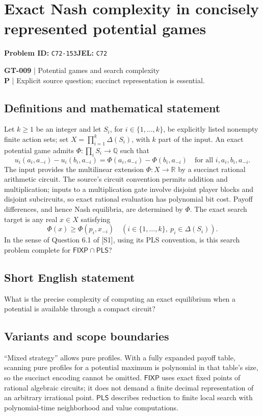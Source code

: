 \documentclass[11pt,a4paper]{article}
\begin{document}
\section*{Exact Nash complexity in concisely represented potential games}
\textbf{Problem ID:} \texttt{C72-153}\quad \textbf{JEL:} \texttt{C72}\par
\label{problem:OP-0139}
\label{game:GT-009}
{\sffamily\small\color{muted}
\textbf{GT-009} | Potential games and search complexity\\
\textbf{P} | Explicit source question; succinct representation is essential.
\par}
\subsection*{Definitions and mathematical statement}
Let $k\geq 1$ be an integer and let $S_i$, for $i\in\{1,\ldots,k\}$, be explicitly listed nonempty finite action sets; set $X=\prod_{i=1}^k\Delta(S_i)$, with $k$ part of the input. An exact potential game admits $\Phi:\prod_iS_i\to\mathbb Q$ such that
\[
 u_i(a_i,a_{-i})-u_i(b_i,a_{-i})
 =\Phi(a_i,a_{-i})-\Phi(b_i,a_{-i})
 \quad\text{for all }i,a_i,b_i,a_{-i}.
\]
The input provides the multilinear extension $\Phi:X\to\mathbb R$ by a succinct rational arithmetic circuit. The source's circuit convention permits addition and multiplication; inputs to a multiplication gate involve disjoint player blocks and disjoint subcircuits, so exact rational evaluation has polynomial bit cost. Payoff differences, and hence Nash equilibria, are determined by $\Phi$.
The exact search target is any real $x\in X$ satisfying
\[
 \Phi(x)\geq\Phi(p_i,x_{-i})\quad
 (i\in\{1,\ldots,k\},\ p_i\in\Delta(S_i)).
\]
In the sense of Question 6.1 of [S1], using its PLS convention, is this search problem complete for $\mathsf{FIXP}\cap\mathsf{PLS}$?
\subsection*{Short English statement}
What is the precise complexity of computing an exact equilibrium when a potential is available through a compact circuit?
\subsection*{Variants and scope boundaries}
``Mixed strategy'' allows pure profiles. With a fully expanded payoff table, scanning pure profiles for a potential maximum is polynomial in that table's size, so the succinct encoding cannot be omitted. $\mathsf{FIXP}$ uses exact fixed points of rational algebraic circuits; it does not demand a finite decimal representation of an arbitrary irrational point. $\mathsf{PLS}$ describes reduction to finite local search with polynomial-time neighborhood and value computations.
\end{document}
